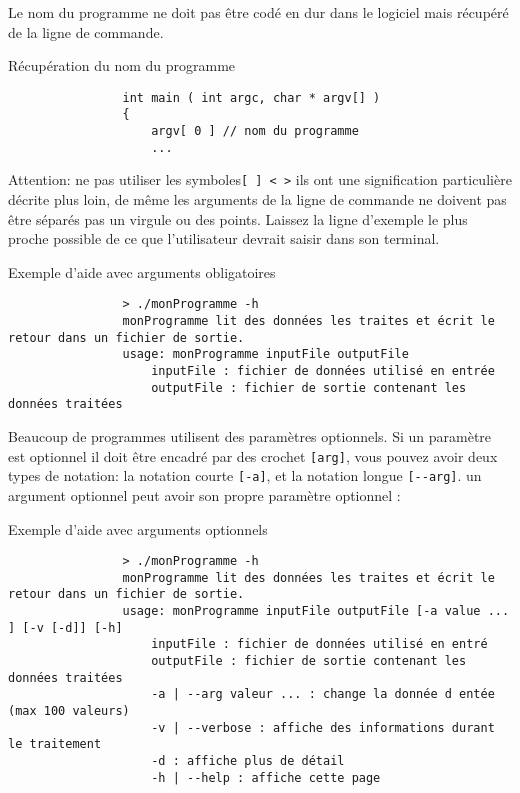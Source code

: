 		Le nom du programme ne doit pas être codé en dur dans le logiciel mais récupéré de la ligne de commande.

		\begin{cbox}{Récupération du nom du programme}
			\begin{verbatim}
				int main ( int argc, char * argv[] )
				{
				    argv[ 0 ] // nom du programme
				    ...
			\end{verbatim}
		\end{cbox}

		Attention: ne pas utiliser les symboles\verb+[ ] < >+ ils ont une signification particulière décrite plus loin, de même les arguments de la ligne de commande ne doivent pas être séparés pas un virgule ou des points. Laissez la ligne d'exemple le plus proche possible de ce que l’utilisateur devrait saisir dans son terminal.

		\begin{cbox}{Exemple d'aide avec arguments obligatoires}
			\begin{verbatim}
				> ./monProgramme -h
				monProgramme lit des données les traites et écrit le retour dans un fichier de sortie.
				usage: monProgramme inputFile outputFile
				    inputFile : fichier de données utilisé en entrée
				    outputFile : fichier de sortie contenant les données traitées
			\end{verbatim}
		\end{cbox}

		Beaucoup de programmes utilisent des paramètres optionnels. Si un paramètre est optionnel il doit être encadré par des crochet \verb+[arg]+, vous pouvez avoir deux types de notation: la notation courte \verb+[-a]+, et la notation longue \verb+[--arg]+. un argument optionnel peut avoir son propre paramètre optionnel :

		\begin{cbox}{Exemple d'aide avec arguments optionnels}
			\begin{verbatim}
				> ./monProgramme -h
				monProgramme lit des données les traites et écrit le retour dans un fichier de sortie.
				usage: monProgramme inputFile outputFile [-a value ... ] [-v [-d]] [-h]
				    inputFile : fichier de données utilisé en entré
				    outputFile : fichier de sortie contenant les données traitées
				    -a | --arg valeur ... : change la donnée d entée (max 100 valeurs)
				    -v | --verbose : affiche des informations durant le traitement
				    -d : affiche plus de détail
				    -h | --help : affiche cette page
			\end{verbatim}
		\end{cbox}

